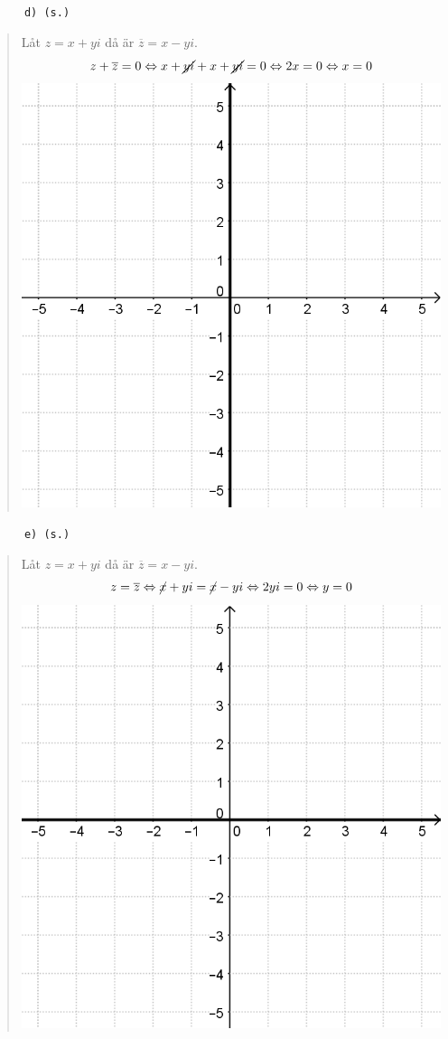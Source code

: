 \documentclass[a4paper]{article}
\newcommand{\tskcol}[1]{\textcolor{tskcol}{#1}}
\begin{document}
	\texttt{\tskcol{~~~~~~d) (s.)}}
	\begin{quotation}
		\noindent
		Låt $z=x+yi$ då är $\overline{z}=x-yi$.
		\[z+\overline{z}=0 \Leftrightarrow
		x+\cancel{yi}+x+\cancel{yi}=0 \Leftrightarrow
		2x=0 \Leftrightarrow
		x=0\]
		\includegraphics[scale=0.2]{images/610d.PNG}
	\end{quotation}
	
	\texttt{\tskcol{~~~~~~e) (s.)}}
	\begin{quotation}
		\noindent
		Låt $z=x+yi$ då är $\overline{z}=x-yi$.
		\[z=\overline{z} \Leftrightarrow
		\cancel{x}+yi=\cancel{x}-yi \Leftrightarrow
		2yi=0 \Leftrightarrow
		y=0\]
		\includegraphics[scale=0.2]{images/610e.PNG}
	\end{quotation}
	
\end{document}
